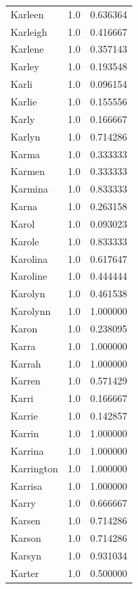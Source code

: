 \documentclass[
  letterpaper,
  DIV=11,
  numbers=noendperiod]{scrreprt}
\begin{document}
\begin{tabular}{lrr}
Karleen         &   1.0 &   0.636364 \\
Karleigh        &   1.0 &   0.416667 \\
Karlene         &   1.0 &   0.357143 \\
Karley          &   1.0 &   0.193548 \\
Karli           &   1.0 &   0.096154 \\
Karlie          &   1.0 &   0.155556 \\
Karly           &   1.0 &   0.166667 \\
Karlyn          &   1.0 &   0.714286 \\
Karma           &   1.0 &   0.333333 \\
Karmen          &   1.0 &   0.333333 \\
Karmina         &   1.0 &   0.833333 \\
Karna           &   1.0 &   0.263158 \\
Karol           &   1.0 &   0.093023 \\
Karole          &   1.0 &   0.833333 \\
Karolina        &   1.0 &   0.617647 \\
Karoline        &   1.0 &   0.444444 \\
Karolyn         &   1.0 &   0.461538 \\
Karolynn        &   1.0 &   1.000000 \\
Karon           &   1.0 &   0.238095 \\
Karra           &   1.0 &   1.000000 \\
Karrah          &   1.0 &   1.000000 \\
Karren          &   1.0 &   0.571429 \\
Karri           &   1.0 &   0.166667 \\
Karrie          &   1.0 &   0.142857 \\
Karrin          &   1.0 &   1.000000 \\
Karrina         &   1.0 &   1.000000 \\
Karrington      &   1.0 &   1.000000 \\
Karrisa         &   1.0 &   1.000000 \\
Karry           &   1.0 &   0.666667 \\
Karsen          &   1.0 &   0.714286 \\
Karson          &   1.0 &   0.714286 \\
Karsyn          &   1.0 &   0.931034 \\
Karter          &   1.0 &   0.500000 \\

\end{tabular}
\end{document}
